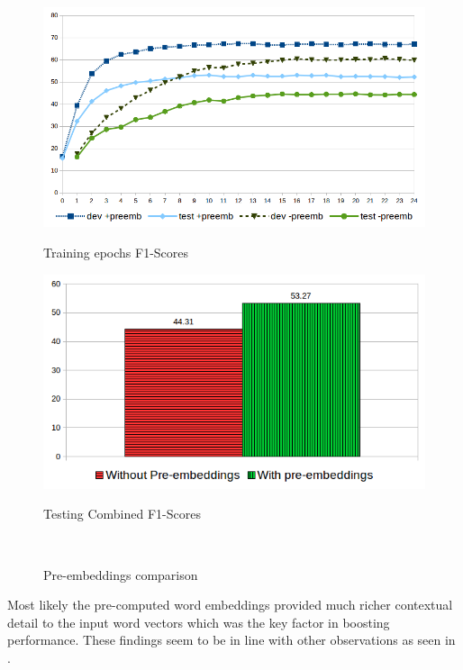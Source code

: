 \begin{figure}[H]
  \begin{minipage}{.5\textwidth}
    \includegraphics[width=\textwidth]{images/bi_lstm_crf_80_20_preembeddings_comparison_line_graph.png}
    \centerline{\footnotesize Training epochs F1-Scores}\medskip
  \end{minipage}\hfill
  \begin{minipage}{.5\textwidth}
    \includegraphics[width=\textwidth]{images/bi_lstm_crf_80_20_preembeddings_comparison_bar_graph.png}
    \centerline{\footnotesize Testing Combined F1-Scores}\medskip
  \end{minipage}\\
  \caption{Pre-embeddings comparison}
  \label{fig:preembcomparison}
\end{figure}

Most likely the pre-computed word embeddings provided much richer contextual detail to the input word vectors which was the key factor in boosting performance. These findings seem to be in line with other observations as seen in \cite{Schneider2016}.

